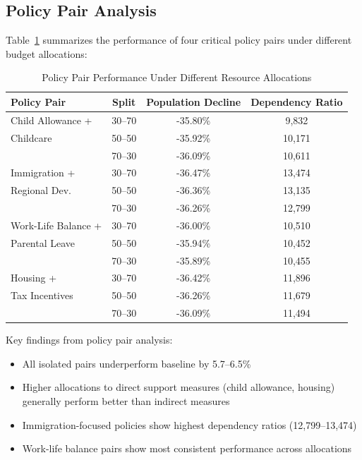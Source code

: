 \documentclass{article} %
\begin{document}
\subsection{Policy Pair Analysis}
Table~\ref{tab:policy_pairs} summarizes the performance of four critical policy pairs under different budget allocations:

\begin{table}[t]
\centering
\caption{Policy Pair Performance Under Different Resource Allocations}
\label{tab:policy_pairs}
\begin{tabular}{lccc}
\toprule
Policy Pair & Split & Population Decline & Dependency Ratio \\
\midrule
Child Allowance + & 30--70 & -35.80\% & 9,832 \\
Childcare & 50--50 & -35.92\% & 10,171 \\
 & 70--30 & -36.09\% & 10,611 \\
\midrule
Immigration + & 30--70 & -36.47\% & 13,474 \\
Regional Dev. & 50--50 & -36.36\% & 13,135 \\
 & 70--30 & -36.26\% & 12,799 \\
\midrule
Work-Life Balance + & 30--70 & -36.00\% & 10,510 \\
Parental Leave & 50--50 & -35.94\% & 10,452 \\
 & 70--30 & -35.89\% & 10,455 \\
\midrule
Housing + & 30--70 & -36.42\% & 11,896 \\
Tax Incentives & 50--50 & -36.26\% & 11,679 \\
 & 70--30 & -36.09\% & 11,494 \\
\bottomrule
\end{tabular}
\end{table}

Key findings from policy pair analysis:
\begin{itemize}
    \item All isolated pairs underperform baseline by 5.7--6.5\%
    \item Higher allocations to direct support measures (child allowance, housing) generally perform better than indirect measures
    \item Immigration-focused policies show highest dependency ratios (12,799--13,474)
    \item Work-life balance pairs show most consistent performance across allocations
\end{itemize}
\end{document}
